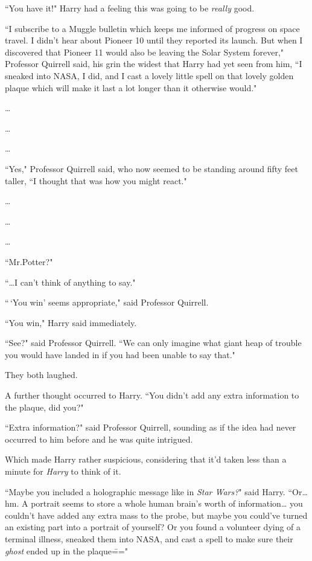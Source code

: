 ``You have it!" Harry had a feeling this was going to be \emph{really} good.

``I subscribe to a Muggle bulletin which keeps me informed of progress on space travel. I didn't hear about Pioneer 10 until they reported its launch. But when I discovered that Pioneer 11 would also be leaving the Solar System forever," Professor Quirrell said, his grin the widest that Harry had yet seen from him, ``I sneaked into NASA, I did, and I cast a lovely little spell on that lovely golden plaque which will make it last a lot longer than it otherwise would."

{\ldots}

{\ldots}

{\ldots}

``Yes," Professor Quirrell said, who now seemed to be standing around fifty feet taller, ``I thought that was how you might react."

{\ldots}

{\ldots}

{\ldots}

``Mr.\?Potter?"

``{\ldots}I can't think of anything to say."

``\,`You win' seems appropriate," said Professor Quirrell.

``You win," Harry said immediately.

``See?" said Professor Quirrell. ``We can only imagine what giant heap of trouble you would have landed in if you had been unable to say that."

They both laughed.

A further thought occurred to Harry. ``You didn't add any extra information to the plaque, did you?"

``Extra information?" said Professor Quirrell, sounding as if the idea had never occurred to him before and he was quite intrigued.

Which made Harry rather suspicious, considering that it'd taken less than a minute for \emph{Harry} to think of it.

``Maybe you included a holographic message like in \emph{Star Wars?}" said Harry. ``Or{\ldots} hm. A portrait seems to store a whole human brain's worth of information{\ldots} you couldn't have added any extra mass to the probe, but maybe you could've turned an existing part into a portrait of yourself? Or you found a volunteer dying of a terminal illness, sneaked them into NASA, and cast a spell to make sure their \emph{ghost} ended up in the plaque\==="

